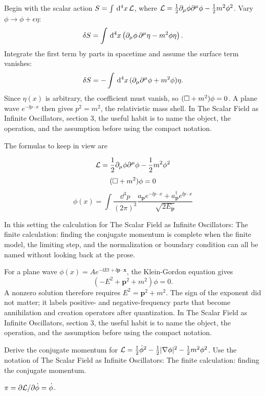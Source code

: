 Begin with the scalar action \(S=\int\,\mathrm d^4x\,\mathcal L\), where \(\mathcal L=\frac12\partial_\mu\phi\partial^\mu\phi-\frac12m^2\phi^2\).  Vary \(\phi\to\phi+\epsilon\eta\):
\[
  \delta S=\int\,\mathrm d^4x\left(\partial_\mu\phi\,\partial^\mu\eta-m^2\phi\eta\right).
\]
Integrate the first term by parts in spacetime and assume the surface term vanishes:
\[
  \delta S=-\int\,\mathrm d^4x\,(\partial_\mu\partial^\mu\phi+m^2\phi)\eta.
\]
Since \(\eta(x)\) is arbitrary, the coefficient must vanish, so \((\Box+m^2)\phi=0\).  A plane wave \(e^{-\ii p\cdot x}\) then gives \(p^2=m^2\), the relativistic mass shell.  In The Scalar Field as Infinite Oscillators, section 3, the useful habit is to name the object, the operation, and the assumption before using the compact notation.

The formulas to keep in view are

\[
  \mathcal L=\frac12\partial_\mu\phi\partial^\mu\phi-\frac12m^2\phi^2
\]
\[
  (\Box+m^2)\phi=0
\]
\[
  \phi(x)=\int\frac{\dd^3p}{(2\pi)^3}\frac{a_{\bm p}e^{-\ii p\cdot x}+a_{\bm p}^\dagger e^{\ii p\cdot x}}{\sqrt{2E_{\bm p}}}
\]

In this setting the calculation for The Scalar Field as Infinite Oscillators: The finite calculation: finding the conjugate momentum is complete when the finite model, the limiting step, and the normalization or boundary condition can all be named without looking back at the prose.




\begin{example}
For a plane wave \(\phi(x)=Ae^{-\ii Et+\ii\bm p\cdot\bm x}\), the Klein-Gordon equation gives
\[
  (-E^2+\bm p^2+m^2)\phi=0.
\]
A nonzero solution therefore requires \(E^2=\bm p^2+m^2\).  The sign of the exponent did not matter; it labels positive- and negative-frequency parts that become annihilation and creation operators after quantization.  In The Scalar Field as Infinite Oscillators, section 3, the useful habit is to name the object, the operation, and the assumption before using the compact notation.
\end{example}



\begin{exercise}
Derive the conjugate momentum for \(\mathcal L=\frac12\dot\phi^2-\frac12|\nabla\phi|^2-\frac12m^2\phi^2\).  Use the notation of The Scalar Field as Infinite Oscillators: The finite calculation: finding the conjugate momentum.
\begin{answer}
\(\pi=\partial\mathcal L/\partial\dot\phi=\dot\phi\).
\end{answer}
\end{exercise}

